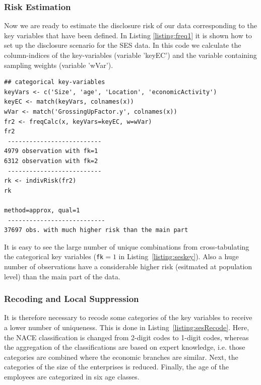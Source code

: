 \documentclass[12pt]{article}
\begin{document}
\subsubsection{Risk Estimation}
Now we are ready to estimate the disclosure risk of our data corresponding to the key variables that have been defined.
In Listing \ref{listing:freq1} it is shown how to set up the disclosure scenario for the SES data. In this code we calculate the column-indices of the key-variables (variable 'keyEC') and the variable containing sampling weights (variable 'wVar').

\begin{lstlisting}[numbers=none,captionpos=b, caption={Frequency and risk estimation of the raw SES data.}, label=listing:seskey]
## categorical key-variables
keyVars <- c('Size', 'age', 'Location', 'economicActivity')
keyEC <- match(keyVars, colnames(x))
wVar <- match('GrossingUpFactor.y', colnames(x))
fr2 <- freqCalc(x, keyVars=keyEC, w=wVar)
fr2
 --------------------------
4979 observation with fk=1 
6312 observation with fk=2 
 --------------------------
rk <- indivRisk(fr2)
rk

method=approx, qual=1
 --------------------------- 
37697 obs. with much higher risk than the main part
\end{lstlisting}

It is easy to see the large number of unique combinations from cross-tabulating the 
categorical key variables (\texttt{fk$=1$} in Listing~\ref{listing:seskey}). Also a huge number of 
observations have a considerable higher risk (esitmated at population level) than the main part of the data.

\subsubsection{Recoding and Local Suppression}

It is therefore necessary to recode some categories of the key variables to receive a lower number of uniqueness.
This is done in Listing~\ref{listing:sesRecode}. Here, the NACE classification is changed from 2-digit codes to 1-digit codes, whereas
the aggregation of the classifications are based on expert knowledge, i.e. those categories are combined where the economic branches 
are similar.
Next, the categories of the size of the enterprises is reduced. Finally, the age of the employees are categorized in six age classes.

\end{document}
